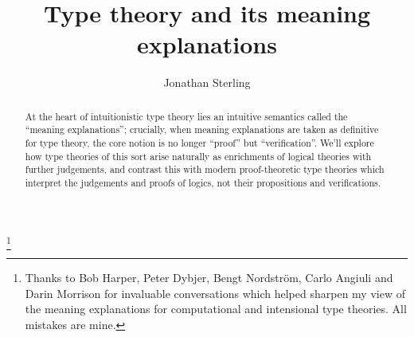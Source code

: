 \documentclass{amsbook}
\theoremstyle{definition}
\theoremstyle{remark}
\numberwithin{equation}{section}
\begin{document}
\title{Type theory and its meaning explanations}
\author{Jonathan Sterling}

\thanks{Thanks to Bob Harper, Peter Dybjer, Bengt Nordstr\"om, Carlo Angiuli
and Darin Morrison for invaluable conversations which helped sharpen my view of
the meaning explanations for computational and intensional type theories. All
mistakes are mine.}

\maketitle

\begin{abstract}
  At the heart of intuitionistic type theory lies an intuitive semantics called
  the ``meaning explanations''; crucially, when meaning explanations are taken as
  definitive for type theory, the core notion is no longer ``proof'' but
  ``verification''. We'll explore how type theories of this sort arise naturally
  as enrichments of logical theories with further judgements, and contrast this
  with modern proof-theoretic type theories which interpret the judgements and
  proofs of logics, not their propositions and verifications.
\end{abstract}

\onehalfspacing

\tableofcontents







\nocite{*}

\end{document}
